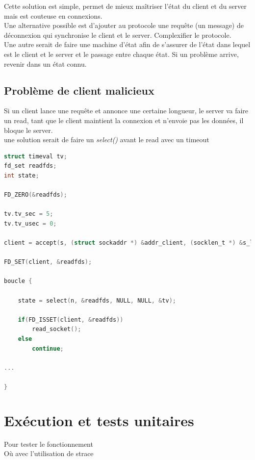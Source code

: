 \documentclass[a4paper,12pt]{article}
\begin{document}
Cette solution est simple, permet de mieux maîtriser l'état du client et du server mais est couteuse en connexions.\\


Une alternative possible est d'ajouter au protocole une requête (un message) de déconnexion qui synchronise le client et le server. Complexifier le protocole.\\

Une autre serait de faire une machine d'état afin de s'assurer de l'état dans lequel est le client et le server et le passage entre chaque état. Si un problème arrive, revenir dans un état connu.

\subsection*{Problème de client malicieux}

Si un client lance une requête et annonce une certaine longueur, le server va faire un read, tant que le client maintient la connexion et n'envoie pas les données, il bloque le server.\\

une solution serait de faire un \emph{select()} avant le read avec un timeout

\begin{lstlisting}[language=C, caption=pseudo code del\_entry()]
struct timeval tv;
fd_set readfds;
int state;

FD_ZERO(&readfds);

tv.tv_sec = 5;
tv.tv_usec = 0;

client = accept(s, (struct sockaddr *) &addr_client, (socklen_t *) &s_len);

FD_SET(client, &readfds);

boucle {

	state = select(n, &readfds, NULL, NULL, &tv);
	
	if(FD_ISSET(client, &readfds))
		read_socket();
	else
		continue;

...

}
\end{lstlisting}


\section{Exécution et tests unitaires}

Pour tester le fonctionnement\\


Où avec l'utilisation de strace
\end{document}
